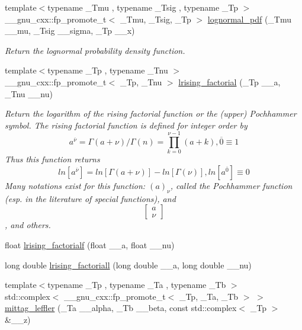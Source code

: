 \begin{DoxyCompactItemize}
{\footnotesize template$<$typename \+\_\+\+Tmu , typename \+\_\+\+Tsig , typename \+\_\+\+Tp $>$ }\\\+\_\+\+\_\+gnu\+\_\+cxx\+::fp\+\_\+promote\+\_\+t$<$ \+\_\+\+Tmu, \+\_\+\+Tsig, \+\_\+\+Tp $>$ \hyperlink{group__gnu__math__spec__func_gaef4db41e58e53144df2ddcc834d88e0b}{lognormal\+\_\+pdf} (\+\_\+\+Tmu \+\_\+\+\_\+mu, \+\_\+\+Tsig \+\_\+\+\_\+sigma, \+\_\+\+Tp \+\_\+\+\_\+x)
\begin{DoxyCompactList}\small\item\em Return the lognormal probability density function. \end{DoxyCompactList}\item 
{\footnotesize template$<$typename \+\_\+\+Tp , typename \+\_\+\+Tnu $>$ }\\\+\_\+\+\_\+gnu\+\_\+cxx\+::fp\+\_\+promote\+\_\+t$<$ \+\_\+\+Tp, \+\_\+\+Tnu $>$ \hyperlink{group__gnu__math__spec__func_ga8912b75b2f7592fb61128c766e7313b9}{lrising\+\_\+factorial} (\+\_\+\+Tp \+\_\+\+\_\+a, \+\_\+\+Tnu \+\_\+\+\_\+nu)
\begin{DoxyCompactList}\small\item\em Return the logarithm of the rising factorial function or the (upper) Pochhammer symbol. The rising factorial function is defined for integer order by \[ a^{\overline{\nu}} = \Gamma(a + \nu) / \Gamma(n) = \prod_{k=0}^{\nu-1} (a + k), \overline{0} \equiv 1 \] Thus this function returns \[ ln[a^{\overline{\nu}}] = ln[\Gamma(a + \nu)] - ln[\Gamma(\nu)], ln[a^{\overline{0}}] \equiv 0 \] Many notations exist for this function\+: $ (a)_\nu $, called the Pochhammer function (esp. in the literature of special functions), and \[ \left[ \begin{array}{c} a \\ \nu \end{array} \right] \], and others. \end{DoxyCompactList}\item 
float \hyperlink{group__gnu__math__spec__func_ga68c64f4e44d03b5b3f75f90dbe2e0819}{lrising\+\_\+factorialf} (float \+\_\+\+\_\+a, float \+\_\+\+\_\+nu)
\item 
long double \hyperlink{group__gnu__math__spec__func_ga1ac811f56f38f7ea7a1e035ec0157f6b}{lrising\+\_\+factoriall} (long double \+\_\+\+\_\+a, long double \+\_\+\+\_\+nu)
\item 
{\footnotesize template$<$typename \+\_\+\+Tp , typename \+\_\+\+Ta , typename \+\_\+\+Tb $>$ }\\std\+::complex$<$ \+\_\+\+\_\+gnu\+\_\+cxx\+::fp\+\_\+promote\+\_\+t$<$ \+\_\+\+Tp, \+\_\+\+Ta, \+\_\+\+Tb $>$ $>$ \hyperlink{group__gnu__math__spec__func_ga1a51079e00fbe5473d8cf9ad3304c5c6}{mittag\+\_\+leffler} (\+\_\+\+Ta \+\_\+\+\_\+alpha, \+\_\+\+Tb \+\_\+\+\_\+beta, const std\+::complex$<$ \+\_\+\+Tp $>$ \&\+\_\+\+\_\+z)

\end{DoxyCompactItemize}
